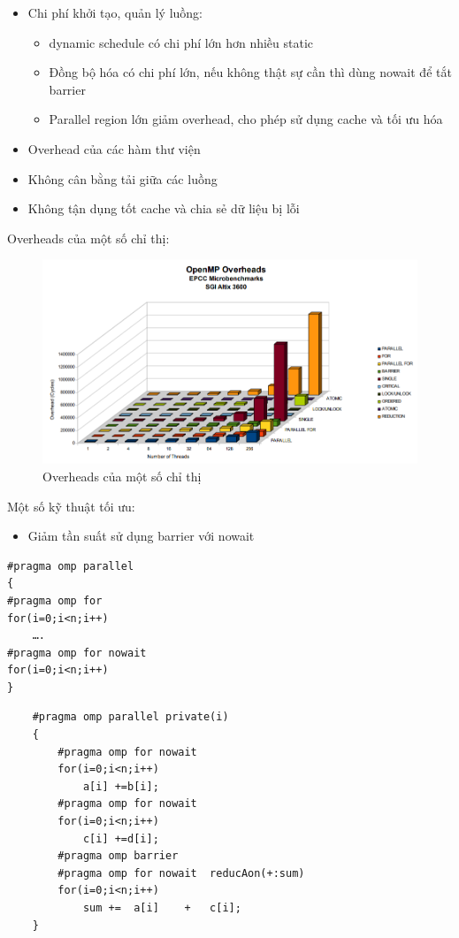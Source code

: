 \documentclass[14pt, a4paper]{article}
\numberwithin{equation}{section}
\numberwithin{figure}{section}
\numberwithin{dl}{section}
\numberwithin{md}{section}
\numberwithin{bd}{section}
\numberwithin{dn}{section}
\numberwithin{hq}{section}
\begin{document}
\begin{itemize}
    \item Chi phí khởi tạo, quản lý luồng:
    \begin{itemize}
        \item dynamic schedule có chi phí lớn hơn nhiều static
        \item Đồng bộ hóa có chi phí lớn, nếu không thật sự cần thì dùng nowait để tắt barrier
        \item Parallel region lớn giảm overhead, cho phép sử dụng cache và tối ưu hóa
    \end{itemize}
    \item Overhead của các hàm thư viện
    \item Không cân bằng tải giữa các luồng
    \item Không tận dụng tốt cache và chia sẻ dữ liệu bị lỗi
\end{itemize}

Overheads của một số chỉ thị:

\begin{figure}[H]
    \centering
    \includegraphics[width=0.8\linewidth]{figures/OpenMP/Overheads_Directives.png}
    \caption{Overheads của một số chỉ thị}
\end{figure}

Một số kỹ thuật tối ưu:

\begin{itemize}
    \item Giảm tần suất sử dụng barrier với nowait
\end{itemize}

\begin{verbatim}
#pragma	omp	parallel	
{	
#pragma	omp	for
for(i=0;i<n;i++)	
    ….	
#pragma	omp	for	nowait
for(i=0;i<n;i++)	
}	
\end{verbatim}

\begin{verbatim}
    #pragma	omp	parallel private(i)	
    {	
        #pragma	omp	for	nowait
        for(i=0;i<n;i++)	
            a[i] +=b[i];	
        #pragma	omp	for	nowait
        for(i=0;i<n;i++)	
            c[i] +=d[i];	
        #pragma	omp	barrier	
        #pragma	omp	for	nowait	reducAon(+:sum)	
        for(i=0;i<n;i++)
            sum	+=	a[i]	+	c[i];	
    }	
\end{verbatim}
\end{document}
